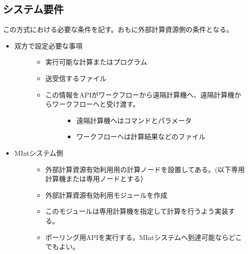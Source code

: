 \documentclass[letterpaper,10pt,dvipdfmx,openany]{sphinxmanual}
\begin{document}
\newpage


\subsection{システム要件}
\label{\detokenize{using_distributed_properties:id18}}
この方式における必要な条件を記す。おもに外部計算資源側の条件となる。
\begin{itemize}
\item {} \begin{description}
\item[{双方で設定必要な事項}] \leavevmode\begin{itemize}
\item {} 
実行可能な計算またはプログラム

\item {} 
送受信するファイル

\item {} \begin{description}
\item[{この情報をAPIがワークフローから遠隔計算機へ、遠隔計算機からワークフローへと受け渡す。}] \leavevmode\begin{itemize}
\item {} 
遠隔計算機へはコマンドとパラメータ

\item {} 
ワークフローへは計算結果などのファイル

\end{itemize}

\end{description}

\end{itemize}

\end{description}

\item {} \begin{description}
\item[{MIntシステム側}] \leavevmode\begin{itemize}
\item {} 
外部計算資源有効利用用の計算ノードを設置してある。(以下専用計算機または専用ノードとする）

\item {} 
外部計算資源有効利用モジュールを作成

\item {} 
このモジュールは専用計算機を指定して計算を行うよう実装する。

\item {} 
ポーリング用APIを実行する。MIntシステムへ到達可能ならどこでもよい。


\end{itemize}
\end{description}
\end{itemize}
\end{document}
